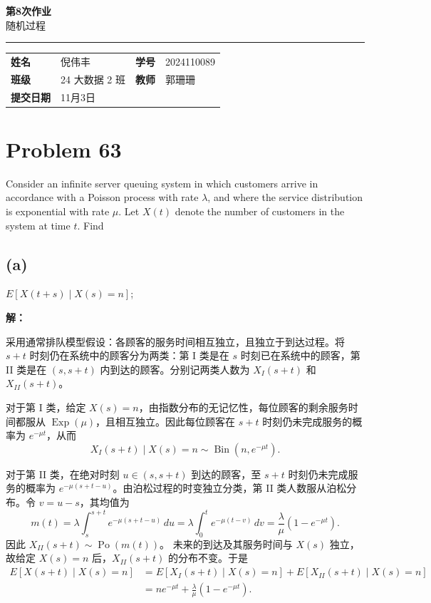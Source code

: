 \documentclass[12pt,a4paper]{article}
\newcommand{\course}{随机过程}
\newcommand{\homeworktitle}{第8次作业}
\newcommand{\studentname}{倪伟丰}
\newcommand{\studentid}{2024110089}
\newcommand{\classname}{24 大数据 2 班}
\newcommand{\teacher}{郭珊珊}
\newcommand{\duedate}{11月3日} %
\begin{document}
\begin{center}
  {\Huge\bfseries\color{mainblue}\homeworktitle}\\[0.6em]
  {\Large\course}\\[1.2em]
  {\color{linegray}\rule{0.9\textwidth}{0.8pt}}
\end{center}

\begin{infobox}
\begin{tabularx}{\linewidth}{>{\bfseries}p{2.2cm} X >{\bfseries}p{2.2cm} X}
姓名 & \studentname & 学号 & \studentid \\
班级 & \classname & 教师 & \teacher \\
提交日期 & \duedate &  &  \\
\end{tabularx}
\end{infobox}

\section{Problem 63}

Consider an infinite server queuing system in which customers arrive in accordance with a Poisson process with rate $\lambda$, and where the service distribution is exponential with rate $\mu$. Let $X(t)$ denote the number of customers in the system at time $t$. Find

\subsection*{(a)}

$E[X(t+s)\mid X(s)=n]$;

\begin{answerbox}
\textbf{解：}

采用通常排队模型假设：各顾客的服务时间相互独立，且独立于到达过程。将 $s+t$ 时刻仍在系统中的顾客分为两类：第 I 类是在 $s$ 时刻已在系统中的顾客，第 II 类是在 $(s,s+t)$ 内到达的顾客。分别记两类人数为 $X_I(s+t)$ 和 $X_{II}(s+t)$。

对于第 I 类，给定 $X(s)=n$，由指数分布的无记忆性，每位顾客的剩余服务时间都服从 $\operatorname{Exp}(\mu)$，且相互独立。因此每位顾客在 $s+t$ 时刻仍未完成服务的概率为 $e^{-\mu t}$，从而
$$
X_I(s+t)\mid X(s)=n\sim\operatorname{Bin}(n,e^{-\mu t}).
$$

对于第 II 类，在绝对时刻 $u\in(s,s+t)$ 到达的顾客，至 $s+t$ 时刻仍未完成服务的概率为 $e^{-\mu(s+t-u)}$。由泊松过程的时变独立分类，第 II 类人数服从泊松分布。令 $v=u-s$，其均值为
$$
m(t)=\lambda\int_s^{s+t}e^{-\mu(s+t-u)}\,du
=\lambda\int_0^t e^{-\mu(t-v)}\,dv
=\frac{\lambda}{\mu}(1-e^{-\mu t}).
$$
因此 $X_{II}(s+t)\sim\operatorname{Po}(m(t))$。
未来的到达及其服务时间与 $X(s)$ 独立，故给定 $X(s)=n$ 后，$X_{II}(s+t)$ 的分布不变。于是
$$
\begin{aligned}
E[X(s+t)\mid X(s)=n]
&=E[X_I(s+t)\mid X(s)=n]+E[X_{II}(s+t)\mid X(s)=n]\\
&=ne^{-\mu t}+\frac{\lambda}{\mu}(1-e^{-\mu t}).
\end{aligned}
$$

\end{answerbox}
\end{document}
